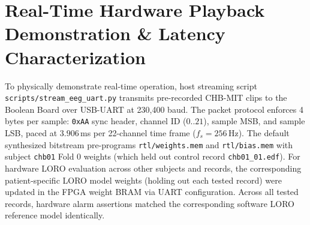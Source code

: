 \documentclass[10pt,twocolumn,letterpaper]{article}
\begin{document}
{\section{Real-Time Hardware Playback Demonstration \& Latency Characterization}
\label{sec:demo}

\begin{table}[t]
\centering
\footnotesize
\color{blue}
\caption{\textcolor{blue}{Real-time hardware playback verification over 230,400-baud UART stream on RealDigital Boolean Board.}}
\label{tab:uart_demo}
\end{table}

To physically demonstrate real-time operation, host streaming script \texttt{scripts/stream\_eeg\_uart.py} transmits pre-recorded CHB-MIT clips to the Boolean Board over USB-UART at 230,400 baud. The packet protocol enforces 4 bytes per sample: \texttt{0xAA} sync header, channel ID ($0..21$), sample MSB, and sample LSB, paced at $3.906$\,ms per 22-channel time frame ($f_s = 256$\,Hz). The default synthesized bitstream pre-programs \texttt{rtl/weights.mem} and \texttt{rtl/bias.mem} with subject \texttt{chb01} Fold 0 weights (which held out control record \texttt{chb01\_01.edf}). For hardware LORO evaluation across other subjects and records, the corresponding patient-specific LORO model weights (holding out each tested record) were updated in the FPGA weight BRAM via UART configuration. Across all tested records, hardware alarm assertions matched the corresponding software LORO reference model identically.

}
\end{document}
